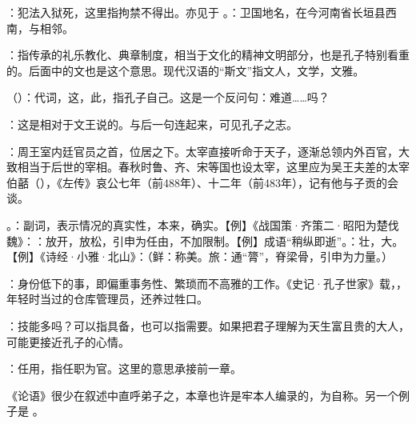 {
\item {}：犯法入狱死，这里指拘禁不得出。亦见于 。：卫国地名，在今河南省长垣县西南，与相邻。%
\item {}：指传承的礼乐教化、典章制度，相当于文化的精神文明部分，也是孔子特别看重的。后面中的文也是这个意思。现代汉语的“斯文”指文人，文学，文雅。
\item {}（）：代词，这，此，指孔子自己。这是一个反问句：难道……吗？
\item {}：这是相对于文王说的。与后一句连起来，可见孔子之志。
}
{}


{
\item {}：周王室内廷官员之首，位居之下。太宰直接听命于天子，逐渐总领内外百官，大致相当于后世的宰相。春秋时鲁、齐、宋等国也设太宰，这里应为吴王夫差的太宰伯嚭（），《左传》哀公七年（前488年）、十二年（前483年），记有他与子贡的会谈。
\item {}。：副词，表示情况的真实性，本来，确实。【例】《战国策·齐策二·昭阳为楚伐魏》：：放开，放松，引申为任由，不加限制。【例】成语“稍纵即逝”。：壮，大。【例】《诗经·小雅·北山》：（鲜：称美。旅：通“膂”，脊梁骨，引申为力量。）
\item {}：身份低下的事，即偏重事务性、繁琐而不高雅的工作。《史记·孔子世家》载，，年轻时当过的仓库管理员，还养过牲口。
\item {}：技能多吗？可以指具备，也可以指需要。如果把君子理解为天生富且贵的大人，可能更接近孔子的心情。
}
{}


{
\begin{lyitemize}
\item {}：任用，指任职为官。这里的意思承接前一章。
\end{lyitemize}
《论语》很少在叙述中直呼弟子之，本章也许是牢本人编录的，为自称。另一个例子是  。
}
{}


